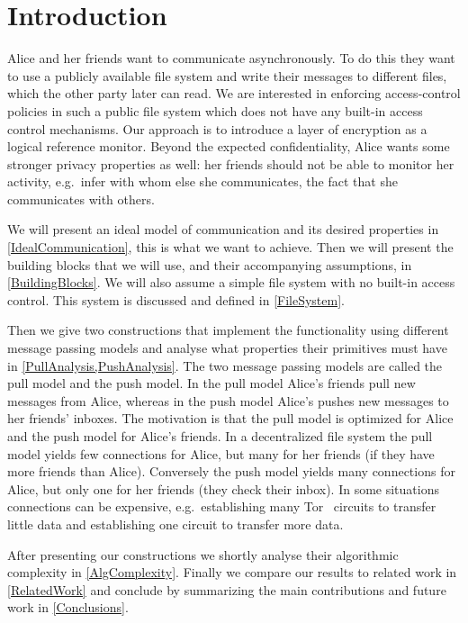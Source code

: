 \acresetall{}
\section{Introduction}\label{Introduction}

Alice and her friends want to communicate asynchronously.
To do this they want to use a publicly available file system and write their 
messages to different files, which the other party later can read.
We are interested in enforcing access-control policies in such a public file 
system which does not have any built-in access control mechanisms.
Our approach is to introduce a layer of encryption as a logical reference 
monitor.
Beyond the expected confidentiality, Alice wants some stronger privacy 
properties as well: her friends should not be able to monitor her activity, 
e.g.\ infer with whom else she communicates, the fact that she communicates 
with others.

We will present an ideal model of communication and its desired properties in 
\cref{IdealCommunication}, this is what we want to achieve.
Then we will present the building blocks that we will use, and their 
accompanying assumptions, in \cref{BuildingBlocks}.
We will also assume a simple file system with no built-in access control.
This system is discussed and defined in \cref{FileSystem}.

Then we give two constructions that implement the functionality using different 
message passing models and analyse what properties their primitives must have 
in \cref{PullAnalysis,PushAnalysis}.
The two message passing models are called the pull model and the push model.
In the pull model Alice's friends pull new messages from Alice, whereas in the 
push model Alice's pushes new messages to her friends' inboxes.
The motivation is that the pull model is optimized for Alice and the push model 
for Alice's friends.
In a decentralized file system the pull model yields few connections for Alice,
but many for her friends (if they have more friends than Alice).
Conversely the push model yields many connections for Alice, but only one for 
her friends (they check their inbox).
In some situations connections can be expensive, e.g.\ establishing many 
Tor~\cite{Tor} circuits to transfer little data and establishing one circuit to 
transfer more data.

After presenting our constructions we shortly analyse their algorithmic 
complexity in \cref{AlgComplexity}.
Finally we compare our results to related work in \cref{RelatedWork} and 
conclude by summarizing the main contributions and future work in 
\cref{Conclusions}.


